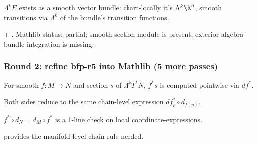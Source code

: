 \begin{lemma}
\label{lem:bfa-r9}
$\Lambda^{k}E$ exists as a smooth vector bundle: chart-locally it's $\Lambda^{k}\R^{n}$, smooth transitions via $\Lambda^{k}$ of the bundle's transition functions.
\leanok
\end{lemma}

\begin{lemma}
\label{lem:bfa-r10}
 + .  Mathlib status: partial; smooth-section module is present, exterior-algebra-bundle integration is missing.
\leanok
\end{lemma}

\subsubsection*{Round 2: refine bfp-r5 into Mathlib (5 more passes)}

\begin{lemma}
\label{lem:bfp-r6}
For smooth $f : M \to N$ and section $s$ of $\Lambda^{k}T^{*}N$, $f^{*}s$ is computed pointwise via $df^{*}$.
\leanok
\end{lemma}

\begin{lemma}
\label{lem:bfp-r7}
Both sides reduce to the same chain-level expression $df_{p}^{*}\circ d_{f(p)}$.
\leanok
\end{lemma}

\begin{lemma}
\label{lem:bfp-r8}
$f^{*}\circ d_{N} = d_{M}\circ f^{*}$ is a 1-line check on local coordinate-expressions.
\leanok
\end{lemma}

\begin{lemma}
\label{lem:bfp-r9}
 provides the manifold-level chain rule needed.
\leanok\mathlibok
\end{lemma}

